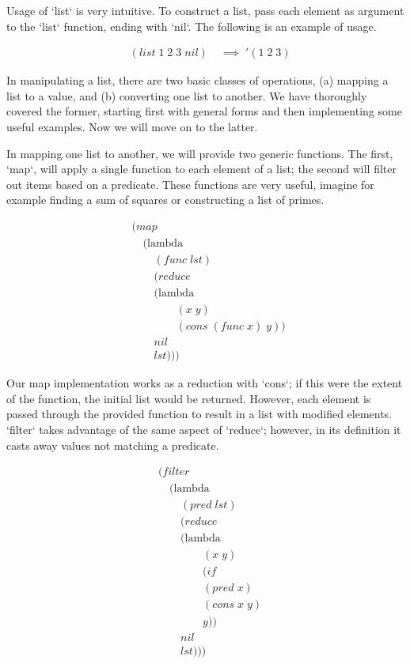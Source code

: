 Usage of `list` is very intuitive. To construct a list, pass each element as 
argument to the `list` function, ending with `nil`. The following is an example of 
usage.   

\begin{align*}
& (list \; 1 \; 2 \; 3 \; nil) \; &\implies \; '(1 \; 2 \; 3)
\end{align*}

In manipulating a list, there are two basic classes of operations, (a) mapping a 
list to a value, and (b) converting one list to another. We have thoroughly 
covered the former, starting first with general forms and then implementing some 
useful examples. Now we will move on to the latter.

In mapping one list to another, we will provide two generic functions. The first, 
`map`, will apply a single function to each element of a list; the second will 
filter out items based on a predicate. These functions are very useful, imagine 
for example finding a sum of squares or constructing a list of primes.

\begin{align*}
& (map \; 
\\& \quad (\text{lambda} \; 
\\& \qquad (func \; lst)
\\& \qquad (reduce
\\& \qquad (\text{lambda} \; 
\\& \qquad \qquad (x \; y) \; 
\\& \qquad \qquad (cons \; (func \; x) \; y)) \; 
\\& \qquad nil
\\& \qquad lst)))
\end{align*}

Our map implementation works as a reduction with `cons`; if this were the extent 
of the function, the initial list would be returned. However, each element is 
passed through the provided function to result in a list with modified elements. 
`filter` takes advantage of the same aspect of `reduce`; however, in its 
definition it casts away values not matching a predicate.

\begin{align*}
& (filter \; 
\\& \quad (\text{lambda} \; 
\\& \qquad (pred \; lst)
\\& \qquad (reduce
\\& \qquad (\text{lambda} \; 
\\& \qquad \qquad (x \; y)
\\& \qquad \qquad (if
\\& \qquad \qquad (pred \; x)
\\& \qquad \qquad (cons \; x \; y)
\\& \qquad \qquad y))
\\& \qquad nil
\\& \qquad lst)))
\end{align*}

